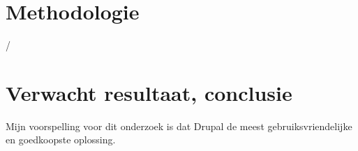 


\section{Methodologie}%
\label{sec:methodologie}

/

\section{Verwacht resultaat, conclusie}%
\label{sec:verwachte_resultaten}

Mijn voorspelling voor dit onderzoek is dat Drupal de meest gebruiksvriendelijke en goedkoopste oplossing.
